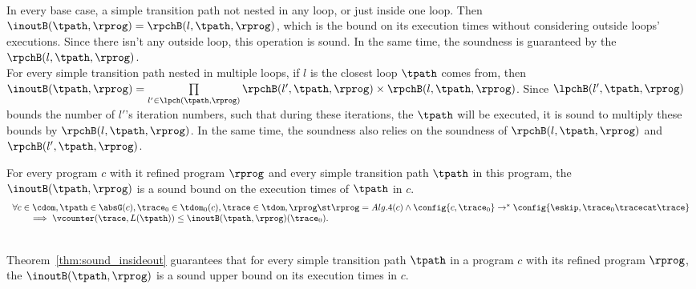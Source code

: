 \\
In every base case, a simple transition path not nested in any loop, or just inside one loop.
Then $\inoutB(\tpath, \rprog) = \rpchB(l, \tpath, \rprog)$, which is the bound on its execution times without considering
outside loops' executions. Since there isn't any outside loop, this operation is sound.
In the same time, the soundness is guaranteed by the $\rpchB(l, \tpath, \rprog)$.
\\
For every simple transition path nested in multiple loops, if $l$ is the closest loop $\tpath$ comes from, then
$\inoutB(\tpath, \rprog) =
\prod\limits_{l' \in \lpch(\tpath, \rprog)} \rpchB(l', \tpath, \rprog) \times \rpchB(l, \tpath, \rprog)$.
Since $\lpchB(l', \tpath, \rprog)$ bounds the number of $l'$'s iteration numbers,
such that during these iterations, the $\tpath$ will be executed,
it is sound to multiply these bounds by $\rpchB(l, \tpath, \rprog)$.
In the same time, the soundness also relies on the soundness of $\rpchB(l, \tpath, \rprog)$ and $\rpchB(l', \tpath, \rprog)$. 
%
\begin{thm}
  \label{thm:sound_insideout}
  For every program $c$ with it refined program $\rprog$ and 
  every simple transition path $\tpath$ in this program,
   the $\inoutB(\tpath, \rprog)$
is a sound bound on the execution times of $\tpath$ in $c$.
  \[
    \begin{array}{l}
    \forall c \in \cdom, \tpath \in \absG(c), \trace_0 \in \tdom_0(c), \trace \in \tdom, \rprog \st 
    \rprog = Alg.4(c)
    \land
    \config{c, \trace_0} \to^* 
    \config{{\eskip, \trace_0 \tracecat \trace}}
    \\ \qquad
    \implies
    \vcounter(\trace, L(\tpath)) \leq \inoutB(\tpath, \rprog)(\trace_0).
    \end{array}
    \]
\end{thm}
\\
Theorem~\ref{thm:sound_insideout} guarantees that
for every simple transition path $\tpath$ in a program $c$ with its refined program $\rprog$,
the $\inoutB(\tpath, \rprog)$
is a sound upper bound on its execution times in $c$.
%
